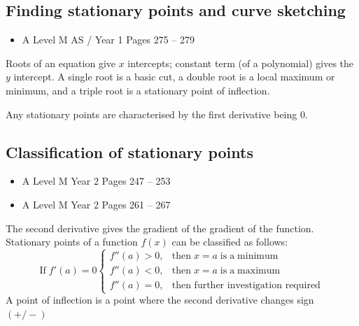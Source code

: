 \documentclass[11pt, a4paper]{article}
\begin{document}
\subsection{Finding stationary points and curve sketching}
\begin{itemize}
\item A Level M AS / Year 1 \hspace{1cm} \phantom{ } Pages 275 -- 279
\end{itemize} \par
Roots of an equation give $x$ intercepts; constant term (of a polynomial) gives the $y$ intercept. A single root is a basic cut, a double root is a local maximum or minimum, and a triple root is a stationary point of inflection. \newline \par 

Any stationary points are characterised by the first derivative being $0$.
\vspace{0.2cm}


\subsection{Classification of stationary points}
\begin{itemize}
\item A Level M Year 2 \hspace{1cm} \phantom{ AS / } Pages 247 -- 253
\item A Level M Year 2 \hspace{1cm} \phantom{ AS / } Pages 261 -- 267
\end{itemize} \par
The second derivative gives the gradient of the gradient of the function. Stationary points of a function $f(x)$ can be classified as follows:
\begin{equation*}
\mathrm{If\;} f'(a)=0 
\begin{cases}
f''(a)>0, & \mathrm{then\;} x=a\; \mathrm{is\; a\; minimum} \\
f''(a)<0, & \mathrm{then\;} x=a\; \mathrm{is\; a\; maximum} \\
f''(a)=0, & \text{then further investigation required}
\end{cases}
\end{equation*}
A point of inflection is a point where the second derivative changes sign $(+/-)$
\vspace{0.5cm}
\end{document}
